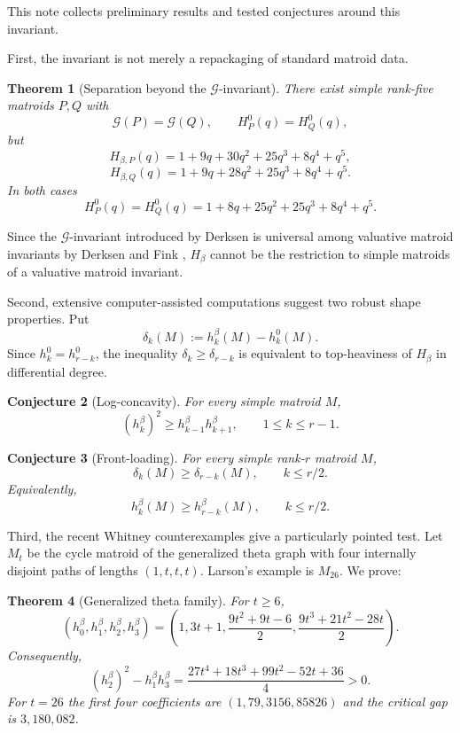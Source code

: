 \documentclass[11pt]{amsart}
\newtheorem{main}{Theorem}
\newtheorem{mconj}[main]{Conjecture}
\theoremstyle{definition}
\theoremstyle{remark}
\begin{document}
\medskip

This note collects preliminary results and tested conjectures around this invariant.

\medskip

First, the invariant is not merely a repackaging of standard matroid data.

\begin{main}[Separation beyond the $\mathcal G$-invariant]\label{thm:G-separation}
There exist simple rank-five matroids $P,Q$ with
\[
\mathcal G(P)=\mathcal G(Q),\qquad H_P^0(q)=H_Q^0(q),
\]
but
\[
H_{\beta,P}(q)=1+9q+30q^2+25q^3+8q^4+q^5,
\]
\[
H_{\beta,Q}(q)=1+9q+28q^2+25q^3+8q^4+q^5.
\]
In both cases
\[
H_P^0(q)=H_Q^0(q)=1+8q+25q^2+25q^3+8q^4+q^5.
\]
\end{main}

Since the $\mathcal G$-invariant introduced by Derksen \cite{Derksen} is universal among valuative matroid invariants by Derksen and Fink \cite{DerksenFink}, $H_\beta$ cannot be the restriction to simple matroids of a valuative matroid invariant.

\medskip

Second, extensive computer-assisted computations suggest two robust shape properties.  Put
\[
\delta_k(M) :=h_k^\beta(M)-h_k^0(M).
\]
Since $h_k^0=h_{r-k}^0$, the inequality $\delta_k\ge\delta_{r-k}$ is equivalent to top-heaviness of $H_\beta$ in differential degree.

\begin{mconj}[Log-concavity]\label{conj:lc}
For every simple matroid $M$,
\[
(h_k^\beta)^2\ge h_{k-1}^\beta h_{k+1}^\beta,
\qquad 1\le k\le r-1.
\]
\end{mconj}

\begin{mconj}[Front-loading]\label{conj:front}
For every simple rank-$r$ matroid $M$,
\[
\delta_k(M)\ge\delta_{r-k}(M),\qquad k\le r/2.
\]
Equivalently,
\[
h_k^\beta(M)\ge h_{r-k}^\beta(M),\qquad k\le r/2.
\]
\end{mconj}

\medskip

Third, the recent Whitney counterexamples give a particularly pointed test.  Let $M_t$ be the cycle matroid of the generalized theta graph with four internally disjoint paths of lengths $(1,t,t,t)$.  Larson's example is $M_{26}$.  We prove:

\begin{main}[Generalized theta family]\label{thm:theta}
For $t\ge6$,
\[
(h_0^\beta,h_1^\beta,h_2^\beta,h_3^\beta)
=
\left(
1,
3t+1,
\frac{9t^2+9t-6}{2},
\frac{9t^3+21t^2-28t}{2}
\right).
\]
Consequently,
\[
(h_2^\beta)^2-h_1^\beta h_3^\beta
=
\frac{27t^4+18t^3+99t^2-52t+36}{4}>0.
\]
For $t=26$ the first four coefficients are $(1,79,3156,85826)$ and the critical gap is $3{,}180{,}082$.
\end{main}
\end{document}
